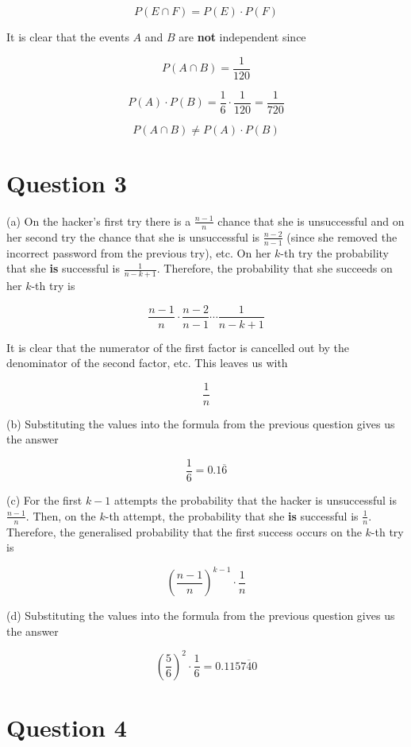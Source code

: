 \documentclass[12pt]{article}
\begin{document}
$$ P(E \cap F) = P(E) \cdot P(F) $$

\indent It is clear that the events $A$ and $B$ are {\bf not} independent since

$$ P(A \cap B) = \frac{1}{120} $$

$$ P(A) \cdot P(B) = \frac{1}{6} \cdot \frac{1}{120} = \frac{1}{720} $$

$$ P(A \cap B) \neq P(A) \cdot P(B) $$

\section*{Question 3}

\noindent (a) On the hacker's first try there is a $\frac{n - 1}{n}$ chance that she is unsuccessful and on her second try the chance that she is unsuccessful is $\frac{n - 2}{n - 1}$ (since she removed the incorrect password from the previous try), etc. On her $k$-th try the probability that she {\bf is} successful is $\frac{1}{n - k + 1}$. Therefore, the probability that she succeeds on her $k$-th try is

$$ \frac{n - 1}{n} \cdot \frac{n - 2}{n - 1} \cdots \frac{1}{n - k + 1}$$

\indent It is clear that the numerator of the first factor is cancelled out by the denominator of the second factor, etc. This leaves us with

$$ \frac{1}{n}$$

\noindent (b) Substituting the values into the formula from the previous question gives us the answer

$$ \frac{1}{6} = 0.1\overline{6} $$

\noindent (c) For the first $k - 1$ attempts the probability that the hacker is unsuccessful is $\frac{n - 1}{n}$. Then, on the $k$-th attempt, the probability that she {\bf is} successful is $\frac{1}{n}$. Therefore, the generalised probability that the first success occurs on the $k$-th try is

$$ \left( \frac{n - 1}{n} \right)^{k - 1} \cdot \frac{1}{n}$$

\noindent (d) Substituting the values into the formula from the previous question gives us the answer

$$ \left( \frac{5}{6} \right)^{2} \cdot \frac{1}{6} = 0.115\overline{740} $$

\section*{Question 4}
\end{document}
